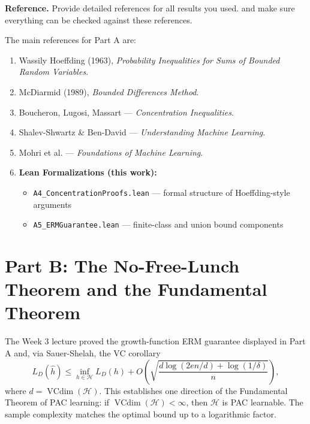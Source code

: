 \documentclass[11pt]{article}
\begin{document}
\textbf{Reference.} Provide detailed references for all results you used. and make sure everything can be checked against these references.
\begin{solutionbox}

The main references for Part A are:

\begin{enumerate}
    \item Wassily Hoeffding (1963), \emph{Probability Inequalities for Sums of Bounded Random Variables}.
    \item McDiarmid (1989), \emph{Bounded Differences Method}.
    \item Boucheron, Lugosi, Massart — \emph{Concentration Inequalities}.
    \item Shalev-Shwartz \& Ben-David — \emph{Understanding Machine Learning}.
    \item Mohri et al. — \emph{Foundations of Machine Learning}.

    \item \textbf{Lean Formalizations (this work):}
    \begin{itemize}
        \item \texttt{A4\_ConcentrationProofs.lean} — formal structure of Hoeffding-style arguments
        \item \texttt{A5\_ERMGuarantee.lean} — finite-class and union bound components
    \end{itemize}

\end{enumerate}

\end{solutionbox}

\section{Part B: The No-Free-Lunch Theorem and the Fundamental Theorem}

The Week 3 lecture proved the growth-function ERM guarantee displayed in Part A and, via Sauer-Shelah, the VC corollary
\[
L_D(\hat{h}) \leq \inf_{h \in \mathcal{H}} L_D(h)
    + O\!\left(
        \sqrt{
            \frac{d \log(2 e n / d) + \log(1/\delta)}{n}
        }
      \right),
\]
where $d=\operatorname{VCdim}(\mathcal{H})$. This establishes one direction of the Fundamental Theorem of PAC learning: if $\operatorname{VCdim}(\mathcal{H})<\infty$, then $\mathcal{H}$ is PAC learnable. The sample complexity matches the optimal bound up to a logarithmic factor.
\end{document}
